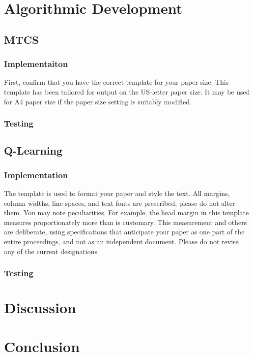 \documentclass[letterpaper, 10 pt, conference]{ieeeconf}   %
\begin{document}
\section{Algorithmic Development}

\subsection{MTCS}

\subsubsection{Implementaiton}
First, confirm that you have the correct template for your paper size. This template has been tailored for output on the US-letter paper size.
It may be used for A4 paper size if the paper size setting is suitably modified.

\subsubsection{Testing}

\subsection{Q-Learning}

\subsubsection{Implementation}

The template is used to format your paper and style the text. All margins, column widths, line spaces, and text fonts are prescribed; please do not alter them. You may note peculiarities. For example, the head margin in this template measures proportionately more than is customary. This measurement and others are deliberate, using specifications that anticipate your paper as one part of the entire proceedings, and not as an independent document. Please do not revise any of the current designations

\subsubsection{Testing}

\section{Discussion}


\section{Conclusion}
\end{document}
